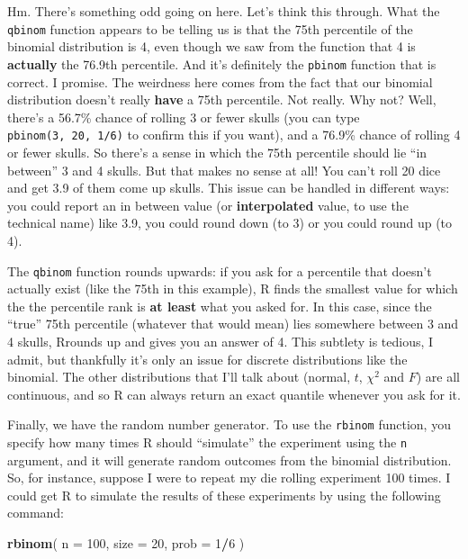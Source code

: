 \documentclass[]{book}
\newenvironment{Shaded}{\begin{snugshade}}{\end{snugshade}}
\newcommand{\DataTypeTok}[1]{\textcolor[rgb]{0.13,0.29,0.53}{#1}}
\newcommand{\DecValTok}[1]{\textcolor[rgb]{0.00,0.00,0.81}{#1}}
\newcommand{\KeywordTok}[1]{\textcolor[rgb]{0.13,0.29,0.53}{\textbf{#1}}}
\newcommand{\NormalTok}[1]{#1}
\newcommand{\OperatorTok}[1]{\textcolor[rgb]{0.81,0.36,0.00}{\textbf{#1}}}
\begin{document}
Hm. There's something odd going on here. Let's think this through. What the \texttt{qbinom} function appears to be telling us is that the 75th percentile of the binomial distribution is 4, even though we saw from the function that 4 is \textbf{actually} the 76.9th percentile. And it's definitely the \texttt{pbinom} function that is correct. I promise. The weirdness here comes from the fact that our binomial distribution doesn't really \textbf{have} a 75th percentile. Not really. Why not? Well, there's a 56.7\% chance of rolling 3 or fewer skulls (you can type \texttt{pbinom(3,\ 20,\ 1/6)} to confirm this if you want), and a 76.9\% chance of rolling 4 or fewer skulls. So there's a sense in which the 75th percentile should lie ``in between'' 3 and 4 skulls. But that makes no sense at all! You can't roll 20 dice and get 3.9 of them come up skulls. This issue can be handled in different ways: you could report an in between value (or \textbf{interpolated} value, to use the technical name) like 3.9, you could round down (to 3) or you could round up (to 4).

The \texttt{qbinom} function rounds upwards: if you ask for a percentile that doesn't actually exist (like the 75th in this example), R finds the smallest value for which the the percentile rank is \textbf{at least} what you asked for. In this case, since the ``true'' 75th percentile (whatever that would mean) lies somewhere between 3 and 4 skulls, Rrounds up and gives you an answer of 4. This subtlety is tedious, I admit, but thankfully it's only an issue for discrete distributions like the binomial. The other distributions that I'll talk about (normal, \(t\), \(\chi^2\) and \(F\)) are all continuous, and so R can always return an exact quantile whenever you ask for it.

Finally, we have the random number generator. To use the \texttt{rbinom} function, you specify how many times R should ``simulate'' the experiment using the \texttt{n} argument, and it will generate random outcomes from the binomial distribution. So, for instance, suppose I were to repeat my die rolling experiment 100 times. I could get R to simulate the results of these experiments by using the following command:

\begin{Shaded}
\begin{Highlighting}[]
\KeywordTok{rbinom}\NormalTok{( }\DataTypeTok{n =} \DecValTok{100}\NormalTok{, }\DataTypeTok{size =} \DecValTok{20}\NormalTok{, }\DataTypeTok{prob =} \DecValTok{1}\OperatorTok{/}\DecValTok{6}\NormalTok{ )}
\end{Highlighting}
\end{Shaded}
\end{document}
